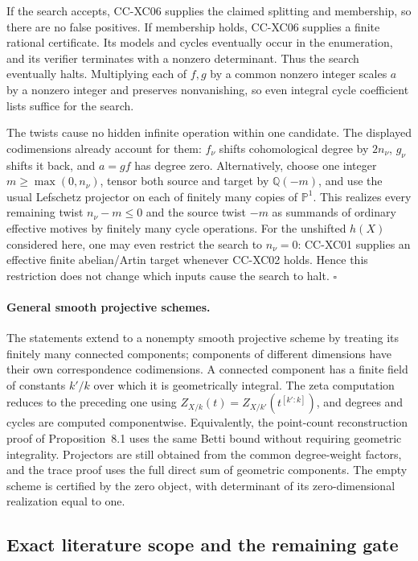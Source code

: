 If the search accepts, CC-XC06 supplies the claimed
splitting and membership, so there are no false positives.
If membership holds, CC-XC06 supplies a finite rational
certificate.  Its models and cycles eventually occur
in the enumeration, and its verifier terminates with
a nonzero determinant.  Thus the search eventually
halts.  Multiplying each of \(f,g\) by a common
nonzero integer scales \(a\) by a nonzero integer
and preserves nonvanishing, so even integral cycle
coefficient lists suffice for the search.

The twists cause no hidden infinite operation within
one candidate.  The displayed codimensions already
account for them: \(f_\nu\) shifts cohomological degree
by \(2n_\nu\), \(g_\nu\) shifts it back, and \(a=gf\)
has degree zero.  Alternatively, choose one integer
\(m\ge\max(0,n_\nu)\), tensor both source and target by
\(\mathbb Q(-m)\), and use the usual Lefschetz projector
on each of finitely many copies of \(\mathbb P^1\).
This realizes every remaining twist \(n_\nu-m\le0\)
and the source twist \(-m\) as summands of ordinary
effective motives by finitely many cycle operations.
For the unshifted \(h(X)\) considered here, one may
even restrict the search to \(n_\nu=0\): CC-XC01
supplies an effective finite abelian/Artin target
whenever CC-XC02 holds.  Hence this restriction does
not change which inputs cause the search to halt.
\(\square\)

\paragraph{General smooth projective schemes.}
The statements extend to a nonempty smooth projective
scheme by treating its finitely many connected components;
components of different dimensions have their own
correspondence codimensions.  A connected component
has a finite field of constants \(k'/k\) over which
it is geometrically integral.  The zeta computation
reduces to the preceding one using
\(Z_{X/k}(t)=Z_{X/k'}(t^{[k':k]})\), and degrees and
cycles are computed componentwise.  Equivalently,
the point-count reconstruction proof of Proposition~8.1
uses the same Betti bound without requiring geometric
integrality.  Projectors are still obtained from the
common degree-weight factors, and the trace proof
uses the full direct sum of geometric components.
The empty scheme is certified by the zero object,
with determinant of its zero-dimensional realization
equal to one.

\subsection{Exact literature scope and the remaining gate}

